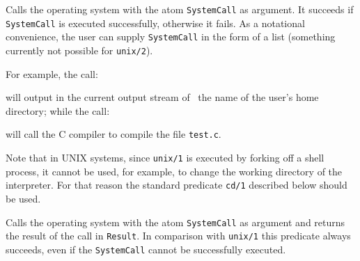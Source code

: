 \begin{description}
%

    Calls the operating system with the atom {\tt SystemCall} as argument.
    It succeeds if {\tt SystemCall} is executed successfully, otherwise it
    fails.  As a notational convenience, the user can supply {\tt SystemCall} 
    in the form of a list (something currently not possible for {\tt unix/2}).

    For example, the call:


    \noindent
    will output in the current output stream of \ourprolog\ the name of
    the user's home directory; while the call:


    \noindent
    will call the C compiler to compile the file {\tt test.c}.

    Note that in UNIX systems, since {\tt unix/1} is executed by forking 
    off a shell process,
    it cannot be used, for example, to change the working directory of the 
    interpreter.  For that reason the standard predicate {\tt cd/1} described 
    below should be used.


    Calls the operating system with the atom {\tt SystemCall} as argument
    and returns the result of the call in {\tt Result}.  In comparison with
    {\tt unix/1} this predicate always succeeds, even if the {\tt SystemCall} 
    cannot be successfully executed.


\end{description}
